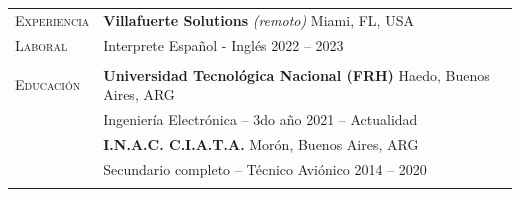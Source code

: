 \documentclass[11pt]{article}
\begin{document}
\vspace{0.5\baselineskip}\noindent
\renewcommand{\arraystretch}{1}%
\begin{tabular}[t]{@{}p{30mm} @{}p{150mm}}

   {\scshape Experiencia}
                     &
   \textbf{Villafuerte Solutions}  \hfill \textit{(remoto)} Miami, FL, USA\vspace{0.015in}                                                                                     \\ {\scshape Laboral} &
   Interprete Español - Inglés  \hfill 2022 -- 2023\vspace{0.015in}
   \vspace{0.7\baselineskip}
    \\
                    &
   \vspace{.3\baselineskip}
   {\noindent\hspace{-50mm}\hrulefill}
   \vspace{.7\baselineskip}
   \\


   {\scshape Educación}
                     &
   \textbf{Universidad Tecnológica Nacional (FRH)}  \hfill Haedo, Buenos Aires, ARG\vspace{0.015in}                                                                                     \\ &
   Ingeniería Electrónica -- 3do año \hfill 2021 -- Actualidad\vspace{0.015in}
   \vspace{0.7\baselineskip}
   \\
                     & \textbf{I.N.A.C. C.I.A.T.A.}  \hfill Morón, Buenos Aires, ARG\vspace{0.015in}                                                                                    \\ &
   Secundario completo -- Técnico Aviónico \hfill 2014 -- 2020\vspace{0.015in}
   \\
                     &
   \vspace{.3\baselineskip}
   {\noindent\hspace{-50mm}\hrulefill}
   \vspace{.7\baselineskip}
   \\




\end{tabular}
\end{document}
